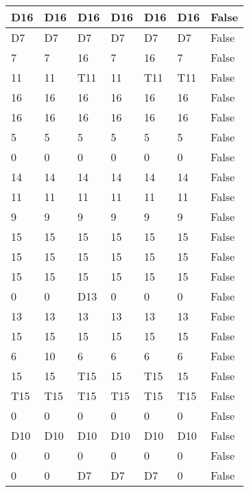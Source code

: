 \begin{longtable}[htbp]{| p{} | p{} | p{}| p{}| p{}| p{}| p{}|}
\multicolumn{1}{|l|}{D16} & \multicolumn{1}{l|}{D16} & \multicolumn{1}{l|}{D16} & \multicolumn{1}{l|}{D16} & \multicolumn{1}{l|}{D16} & \multicolumn{1}{l|}{D16} & False \\ \hline
\multicolumn{1}{|l|}{D7} & \multicolumn{1}{l|}{D7} & \multicolumn{1}{l|}{D7} & \multicolumn{1}{l|}{D7} & \multicolumn{1}{l|}{D7} & \multicolumn{1}{l|}{D7} & False \\ \hline
7 & 7 & 16 & 7 & 16 & 7 & False \\ \hline
11 & 11 & \multicolumn{1}{l|}{T11} & 11 & \multicolumn{1}{l|}{T11} & \multicolumn{1}{l|}{T11} & False \\ \hline
16 & 16 & 16 & 16 & 16 & 16 & False \\ \hline
16 & 16 & 16 & 16 & 16 & 16 & False \\ \hline
5 & 5 & 5 & 5 & 5 & 5 & False \\ \hline
0 & 0 & 0 & 0 & 0 & 0 & False \\ \hline
14 & 14 & 14 & 14 & 14 & 14 & False \\ \hline
11 & 11 & 11 & 11 & 11 & 11 & False \\ \hline
9 & 9 & 9 & 9 & 9 & 9 & False \\ \hline
15 & 15 & 15 & 15 & 15 & 15 & False \\ \hline
15 & 15 & 15 & 15 & 15 & 15 & False \\ \hline
15 & 15 & 15 & 15 & 15 & 15 & False \\ \hline
0 & 0 & \multicolumn{1}{l|}{D13} & 0 & 0 & 0 & False \\ \hline
13 & 13 & 13 & 13 & 13 & 13 & False \\ \hline
15 & 15 & 15 & 15 & 15 & 15 & False \\ \hline
6 & 10 & 6 & 6 & 6 & 6 & False \\ \hline
15 & 15 & \multicolumn{1}{l|}{T15} & 15 & \multicolumn{1}{l|}{T15} & 15 & False \\ \hline
\multicolumn{1}{|l|}{T15} & \multicolumn{1}{l|}{T15} & \multicolumn{1}{l|}{T15} & \multicolumn{1}{l|}{T15} & \multicolumn{1}{l|}{T15} & \multicolumn{1}{l|}{T15} & False \\ \hline
0 & 0 & 0 & 0 & 0 & 0 & False \\ \hline
\multicolumn{1}{|l|}{D10} & \multicolumn{1}{l|}{D10} & \multicolumn{1}{l|}{D10} & \multicolumn{1}{l|}{D10} & \multicolumn{1}{l|}{D10} & \multicolumn{1}{l|}{D10} & False \\ \hline
0 & 0 & 0 & 0 & 0 & 0 & False \\ \hline
0 & 0 & \multicolumn{1}{l|}{D7} & \multicolumn{1}{l|}{D7} & \multicolumn{1}{l|}{D7} & 0 & False \\ \hline

\end{longtable}
